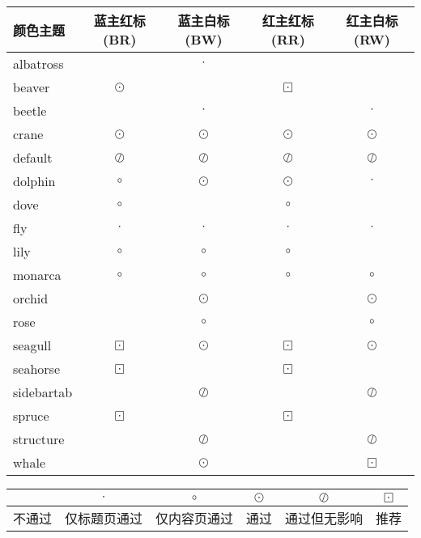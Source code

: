 \documentclass[a4paper,12pt]{article}
\begin{document}
\begin{CJK}{UTF8}{song}
\begin{center}
    \begin{tabular}{|>{\ttfamily}m{5em}|c|c|c|c|}
        \hline
        颜色主题 & 蓝主红标(BR) & 蓝主白标(BW) & 红主红标(RR) & 红主白标(RW) \\
        \hline
        albatross   &           & $\cdot$ &          &   \\
        beaver      & $\odot $  &         & $\boxdot $ &          \\
        beetle      &           & $\cdot$  &          & $\cdot$  \\
        crane       & $\odot $  & $\odot $ & $\odot $  & $\odot $ \\
        default     & $\oslash$ & $\oslash$ & $\oslash$ & $\oslash$ \\
        dolphin     & $\circ $  & $\odot $ & $\odot $  & $\cdot$ \\
        dove        & $\circ$   &          & $\circ$   &  \\
        fly         & $\cdot$   & $\cdot$ & $\cdot$ & $\cdot$  \\
        lily        & $\circ$   &  $\circ$ & $\circ$ & \\
        monarca     & $\circ$   &  $\circ$  &  $\circ$  &  $\circ$  \\
        orchid      &           & $\odot $ & & $\odot $\\
        rose    &  &$\circ$ & & $\circ$  \\
        seagull & $\boxdot$ & $\odot $ & $\boxdot$ & $\odot $ \\
        seahorse & $\boxdot$ & & $\boxdot$ & \\
        sidebartab & & $\oslash  $ & & $\oslash  $ \\
        spruce  & $\boxdot$ & & $\boxdot$ & \\
        structure & & $\oslash  $ &  & $\oslash  $\\
        whale & & $\odot $ & & $\boxdot $ \\
        \hline
    \end{tabular}

    \begin{tabular}{|c|c|c|c|c|c|}
        \hline
                & $\cdot$ & $\circ$ & $\odot $ & $\oslash  $ & $\boxdot$ \\
        \hline
        不通过  &  仅标题页通过 & 仅内容页通过 & 通过 & 通过但无影响 & 推荐 \\
        \hline 
    \end{tabular}
\end{center}


\end{CJK}
\end{document}
